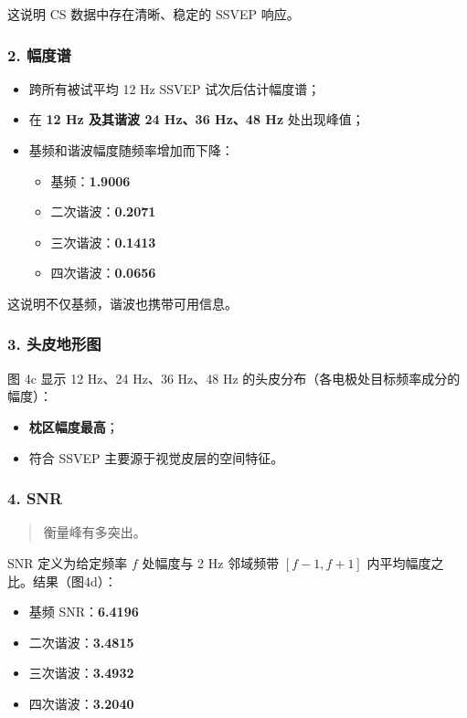 \documentclass[12pt, a4paper]{ctexart}
\begin{document}
这说明 CS 数据中存在清晰、稳定的 SSVEP 响应。

\subsubsection*{2. 幅度谱}

\begin{itemize}
  \item 跨所有被试平均 12 Hz SSVEP 试次后估计幅度谱；
  \item 在 \textbf{12 Hz 及其谐波 24 Hz、36 Hz、48 Hz} 处出现峰值；
  \item 基频和谐波幅度随频率增加而下降：
  \begin{itemize}
    \item 基频：\textbf{1.9006}
    \item 二次谐波：\textbf{0.2071}
    \item 三次谐波：\textbf{0.1413}
    \item 四次谐波：\textbf{0.0656}
  \end{itemize}
\end{itemize}

这说明不仅基频，谐波也携带可用信息。

\subsubsection*{3. 头皮地形图}

图 4c 显示 12 Hz、24 Hz、36 Hz、48 Hz 的头皮分布（各电极处目标频率成分的幅度）：

\begin{itemize}
  \item \textbf{枕区幅度最高}；
  \item 符合 SSVEP 主要源于视觉皮层的空间特征。
\end{itemize}

\subsubsection*{4. SNR}

\begin{quote}
衡量峰有多突出。
\end{quote}

SNR 定义为给定频率 $f$ 处幅度与 2 Hz 邻域频带 $[f-1, f+1]$ 内平均幅度之比。结果（图4d）：

\begin{itemize}
  \item 基频 SNR：\textbf{6.4196}
  \item 二次谐波：\textbf{3.4815}
  \item 三次谐波：\textbf{3.4932}
  \item 四次谐波：\textbf{3.2040}
\end{itemize}
\end{document}
